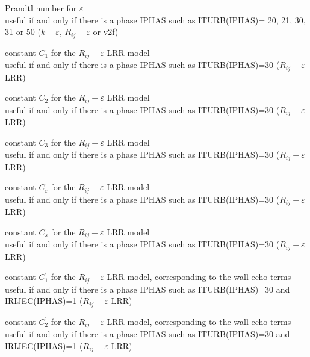 {Prandtl number for $\varepsilon$\\
useful if and only if there is a phase IPHAS such as ITURB(IPHAS)= 20,
21, 30, 31 or 50 ($k-\varepsilon$, $R_{ij}-\varepsilon$ or v2f)}


{constant $C_1$ for the $R_{ij}-\varepsilon$ LRR model\\
useful if and only if there is a phase IPHAS such as ITURB(IPHAS)=30
($R_{ij}-\varepsilon$ LRR)}

{constant $C_2$ for the $R_{ij}-\varepsilon$ LRR model\\
useful if and only if there is a phase IPHAS such as ITURB(IPHAS)=30
($R_{ij}-\varepsilon$ LRR)}

{constant $C_3$ for the $R_{ij}-\varepsilon$ LRR model\\
useful if and only if there is a phase IPHAS such as ITURB(IPHAS)=30
($R_{ij}-\varepsilon$ LRR)}

{constant $C_\varepsilon$ for the $R_{ij}-\varepsilon$ LRR model\\
useful if and only if there is a phase IPHAS such as ITURB(IPHAS)=30
($R_{ij}-\varepsilon$ LRR)}

{constant $C_s$ for the $R_{ij}-\varepsilon$ LRR model\\
useful if and only if there is a phase IPHAS such as ITURB(IPHAS)=30
($R_{ij}-\varepsilon$ LRR)}

{constant $C_1^\prime$ for the $R_{ij}-\varepsilon$ LRR model, corresponding to
the wall echo terms\\
useful if and only if there is a phase IPHAS such as ITURB(IPHAS)=30 and IRIJEC(IPHAS)=1
($R_{ij}-\varepsilon$ LRR)}

{constant $C_2^\prime$ for the $R_{ij}-\varepsilon$ LRR model, corresponding to
the wall echo terms\\
useful if and only if there is a phase IPHAS such as ITURB(IPHAS)=30 and IRIJEC(IPHAS)=1
($R_{ij}-\varepsilon$ LRR)}


